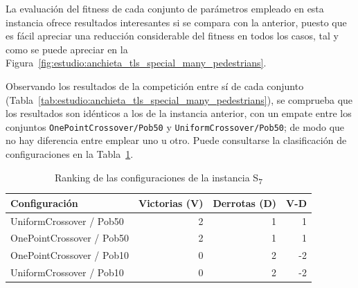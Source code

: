 La evaluación del fitness de cada conjunto de parámetros empleado en esta instancia ofrece resultados interesantes si se compara con la anterior, puesto que es fácil apreciar una reducción considerable del fitness en todos los casos, tal y como se puede apreciar en la Figura~\ref{fig:estudio:anchieta_tls_special_many_pedestrians}.  

Observando los resultados de la competición entre sí de cada conjunto (Tabla~\ref{tab:estudio:anchieta_tls_special_many_pedestrians}), se comprueba que los resultados son idénticos a los de la instancia anterior, con un empate entre los conjuntos \texttt{OnePointCrossover/Pob50} y \texttt{UniformCrossover/Pob50}; de modo que no hay diferencia entre emplear uno u otro. Puede consultarse la clasificación de configuraciones en la Tabla~\ref{tab:rankingS7}.

\begin{table}[h]
\centering
\caption{Ranking de las configuraciones de la instancia S\textsubscript{7}}
\label{tab:rankingS7}
\begin{tabular}{lrrr}
\hline
\multicolumn{1}{l}{\textbf{Configuración}} & \textbf{Victorias (V)} & \textbf{Derrotas (D)} & \textbf{V-D} \\ \hline
UniformCrossover / Pob50                   & 2                      & 1                     & 1            \\ \hline
OnePointCrossover / Pob50                  & 2                      & 1                     & 1            \\ \hline
OnePointCrossover / Pob10                  & 0                      & 2                     & -2           \\ \hline
UniformCrossover / Pob10                   & 0                      & 2                     & -2           \\ \hline
\end{tabular}
\end{table}

